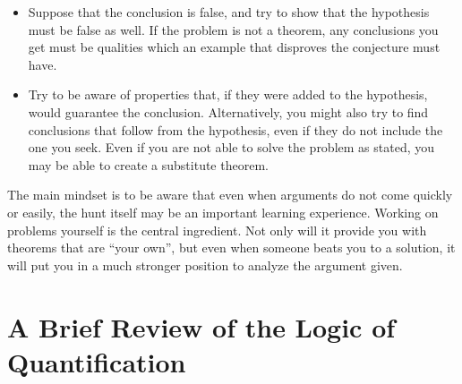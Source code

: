 \documentclass{article}
\begin{document}
\begin{itemize}

  \item[6.] Suppose that the conclusion is false, and try to show that the hypothesis must be false as well. If the problem is not a theorem, any conclusions you get must be qualities which an example that disproves the conjecture must have.

  \item[7.] Try to be aware of properties that, if they were added to the hypothesis, would guarantee the conclusion. Alternatively, you might also try to find conclusions that follow from the hypothesis, even if they do not include the one you seek. Even if you are not able to solve the problem as stated, you may be able to create a substitute theorem.

\end{itemize}

The main mindset is to be aware that even when arguments do not come quickly or easily, the hunt itself may be an important learning experience. Working on problems yourself is the central ingredient. Not only will it provide you with theorems that are ``your own'', but even when someone beats you to a solution, it will put you in a much stronger position to analyze the argument given.



\section{A Brief Review of the Logic of Quantification}
\end{document}
